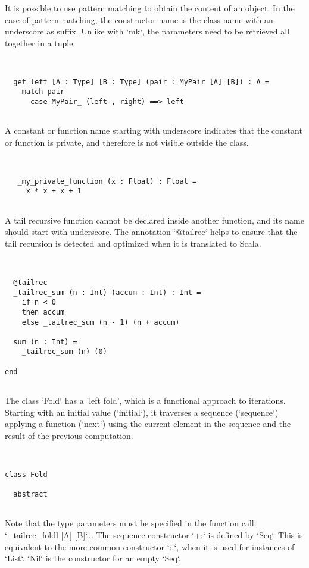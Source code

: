 \documentclass[12pt,a4paper]{article}
\begin{document}
  It is possible to use pattern matching to obtain the content of an object.
   In the case of pattern matching, the constructor name is the class name with an underscore
   as suffix.
   Unlike with `mk`, the parameters need to be retrieved all together in a tuple.


\begin{lstlisting}


  get_left [A : Type] [B : Type] (pair : MyPair [A] [B]) : A =
    match pair
      case MyPair_ (left , right) ==> left


\end{lstlisting}

  A constant or function name starting with underscore indicates that the constant or
   function is private, and therefore is not visible outside the class.


\begin{lstlisting}


   _my_private_function (x : Float) : Float =
     x * x + x + 1


\end{lstlisting}

  A tail recursive function cannot be declared inside another function, and its name should
   start with underscore. The annotation `@tailrec` helps to ensure that the tail recursion
   is detected and optimized when it is translated to Scala.


\begin{lstlisting}


  @tailrec
  _tailrec_sum (n : Int) (accum : Int) : Int =
    if n < 0
    then accum
    else _tailrec_sum (n - 1) (n + accum)

  sum (n : Int) =
    _tailrec_sum (n) (0)

end


\end{lstlisting}

The class `Fold` has a 'left fold', which is a functional approach to iterations. Starting
 with an initial value (`initial`), it traverses a sequence (`sequence`) applying a function
 (`next`) using the current element in the sequence and the result of the previous
 computation.


\begin{lstlisting}


class Fold

  abstract


\end{lstlisting}

  Note that the type parameters must be specified in the function call:
   `_tailrec_foldl [A] [B]`...
   The sequence constructor `+:` is defined by `Seq`.
   This is equivalent to the more common constructor `::`, when it is used for instances of
   `List`. `Nil` is the constructor for an empty `Seq`.
\end{document}
